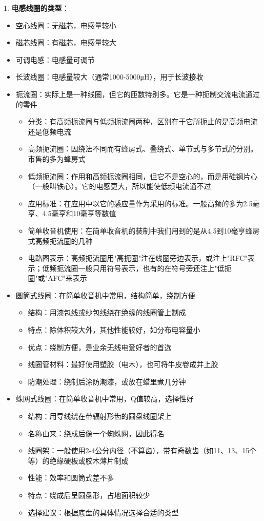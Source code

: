\documentclass[12pt,UTF8]{ctexbook}
\begin{document}
1. \textbf{电感线圈的类型}：
   \begin{itemize}[leftmargin=3.5em]
   \item 空心线圈：无磁芯，电感量较小
   \item 磁芯线圈：有磁芯，电感量较大
   \item 可调电感：电感量可调节
   \item 长波线圈：电感量较大（通常1000-5000μH），用于长波接收
   \item 扼流圈：实际上是一种线圈，但它的匝数特别多。它是一种扼制交流电流通过的零件
     \begin{itemize}[leftmargin=3.5em]
     \item 分类：有高频扼流圈与低频扼流圈两种，区别在于它所扼止的是高频电流还是低频电流
     \item 高频扼流圈：因绕法不同而有蜂房式、叠绕式、单节式与多节式的分别。市售的多为蜂房式
     \item 低频扼流圈：作用和高频扼流圈相同，但它不是空心的，而是用硅钢片心（一般叫铁心）。它的电感更大，所以能使低频电流通不过
     \item 应用标准：在应用中以它的感应量作为采用的标准。一般高频的多为2.5毫亨、4.5毫亨和10毫亨等数值
     \item 简单收音机使用：在简单收音机的装制中我们用到的是从4.5到10毫亨蜂房式高频扼流圈的几种
     \item 电路图表示：高频扼流圈用"高扼圈"注在线圈旁边表示，或注上"RFC"表示；低频扼流圈一般只用符号表示，也有的在符号旁还注上"低扼圈"或"AFC"来表示
     \end{itemize}
   \item 圆筒式线圈：在简单收音机中常用，结构简单，绕制方便
     \begin{itemize}[leftmargin=3.5em]
     \item 结构：用漆包线或纱包线绕在绝缘的线圈管上制成
     \item 特点：除体积较大外，其他性能较好，如分布电容量小
     \item 优点：绕制方便，是业余无线电爱好者的首选
     \item 线圈管材料：最好使用塑胶（电木），也可将牛皮卷成并上胶
     \item 防潮处理：绕制后涂防潮漆，或放在蜡里煮几分钟
     \end{itemize}
   \item 蛛网式线圈：在简单收音机中常用，Q值较高，选择性好
     \begin{itemize}[leftmargin=3.5em]
     \item 结构：用导线绕在带辐射形齿的圆盘线圈架上
     \item 名称由来：绕成后像一个蜘蛛网，因此得名
     \item 线圈架：一般使用2-4公分内径（不算齿），带有奇数齿（如11、13、15个等）的绝缘硬板或胶木薄片制成
     \item 性能：效率和圆筒式差不多
     \item 特点：绕成后呈圆盘形，占地面积较少
     \item 选择建议：根据底盘的具体情况选择合适的类型
     \end{itemize}
   \end{itemize}
\end{document}
